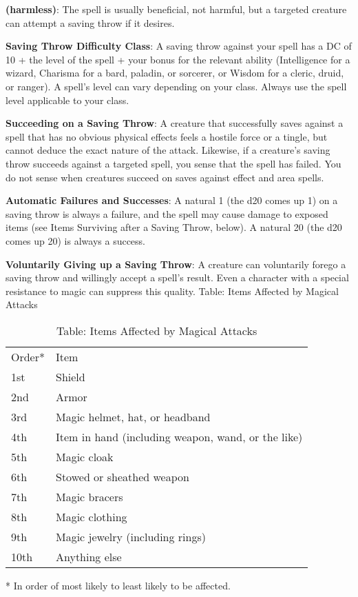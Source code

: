 \textbf{(harmless)}: The spell is usually beneficial, not harmful, but a targeted creature can attempt a saving throw if it desires.
				
\textbf{Saving Throw Difficulty Class}: A saving throw against your spell has a DC of 10 + the level of the spell + your bonus for the relevant ability (Intelligence for a wizard, Charisma for a bard, paladin, or sorcerer, or Wisdom for a cleric, druid, or ranger). A spell's level can vary depending on your class. Always use the spell level applicable to your class.
				
\textbf{Succeeding on a Saving Throw}: A creature that successfully saves against a spell that has no obvious physical effects feels a hostile force or a tingle, but cannot deduce the exact nature of the attack. Likewise, if a creature's saving throw succeeds against a targeted spell, you sense that the spell has failed. You do not sense when creatures succeed on saves against effect and area spells.
				
\textbf{Automatic Failures and Successes}: A natural 1 (the d20 comes up 1) on a saving throw is always a failure, and the spell may cause damage to exposed items (see Items Surviving after a Saving Throw, below). A natural 20 (the d20 comes up 20) is always a success.
				
\textbf{Voluntarily Giving up a Saving Throw}: A creature can voluntarily forego a saving throw and willingly accept a spell's result. Even a character with a special resistance to magic can suppress this quality.
Table: Items Affected by Magical Attacks
\begin{table}[]
\caption{Table: Items Affected by Magical Attacks}
\begin{tabular}{ll}
Order* & Item\\
1st & Shield \\
 2nd & Armor \\
 3rd & Magic helmet, hat, or headband \\
 4th & Item in hand  (including weapon, wand, or the like) \\
 5th & Magic cloak \\
 6th & Stowed or sheathed weapon \\
 7th & Magic bracers \\
 8th & Magic clothing \\
 9th & Magic jewelry (including rings) \\
 10th & Anything else\\
\end{tabular}
* In order of most likely to least likely to be affected.\\
\end{table}

